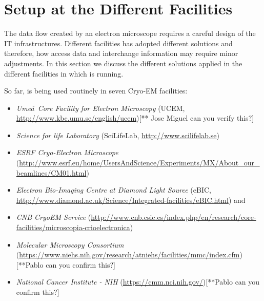 \section{\scipion Setup at the Different Facilities}

The data flow created by an electron microscope requires a careful design of the IT infrastructures.  Different facilities has adopted different solutions and therefore, how \scipion  access data and interchange information may require minor adjustments. In this section we discuss  the different solutions applied in the different facilities in which \scipion is running.

So far, \scipion is being used routinely in seven Cryo-EM facilities:
\begin{itemize}
 \itemsep0em 

 \item \emph{Ume\aa\ Core Facility for Electron Microscopy} (UCEM, \url{http://www.kbc.umu.se/english/ucem})[** Jose Miguel can you verify this?] 
 \item \emph{Science for life Laboratory} (SciLifeLab, \url{http://www.scilifelab.se})
 \item \emph{ESRF Cryo-Electron Microscope} (\url{http://www.esrf.eu/home/UsersAndScience/Experiments/MX/About_our_beamlines/CM01.html})
 \item \emph{Electron Bio-Imaging Centre at Diamond Light Source} (eBIC, \url{http://www.diamond.ac.uk/Science/Integrated-facilities/eBIC.html}) and
 \item \emph{CNB CryoEM Service} (\url{http://www.cnb.csic.es/index.php/en/research/core-facilities/microscopia-crioelectronica})
 \item \emph{Molecular Microscopy Consortium} (\url{https://www.niehs.nih.gov/research/atniehs/facilities/mmc/index.cfm})[**Pablo can you confirm this?]
 \item \emph{National Cancer Institute - NIH} (\url{https://cmm.nci.nih.gov/})[**Pablo can you confirm this?]
 
 

\end{itemize}


